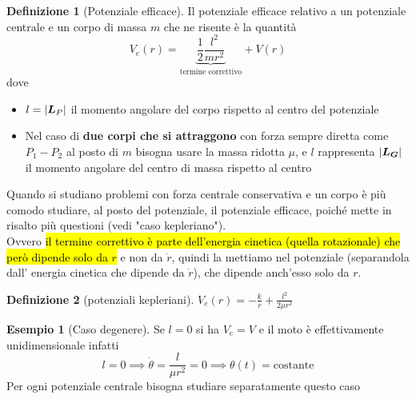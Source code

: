 \documentclass[a4paper,10pt]{article}
\theoremstyle{definition}
\newcommand{\bv}{\boldsymbol} %
\theoremstyle{indentdefinition}
\newtheorem{defn}{Definizione}[section]
\theoremstyle{indenttheorem}
\theoremstyle{myremark}
\newtheorem{example*}{Esempio}
\theoremstyle{indentgeneral}
\begin{document}
\begin{defn}[Potenziale efficace] Il potenziale efficace relativo a un potenziale centrale e un corpo di massa $m$ che ne risente è la quantità
$$V_e(r)=\underbrace{\frac{1}{2}\frac{l^2}{m r^2}}_{\text{termine correttivo}}+V(r)$$
dove 
\begin{itemize}
    \item $l=\abs{\bv{L}_P}$ il momento angolare del corpo rispetto al centro del potenziale
    \item Nel caso di \textbf{due corpi che si attraggono} con forza sempre diretta come $P_1-P_2$ al posto di $m$ bisogna usare la massa ridotta $\mu$, e $l$ rappresenta  $\abs{\bv{L}_{\bv{G}}}$ il momento angolare del centro di massa rispetto al centro
\end{itemize}

Quando si studiano problemi con forza centrale conservativa e un corpo è più comodo studiare, al posto del potenziale, il potenziale efficace, poiché mette in risalto più questioni (vedi "caso kepleriano"). \\Ovvero \hl{il termine correttivo è parte dell'energia cinetica (quella rotazionale) che però dipende solo da $r$} e non da $\dot{r}$, quindi la mettiamo nel potenziale (separandola dall' energia cinetica che dipende da $\dot{r}$), che dipende anch'esso solo da $r$.
    
\end{defn}

\begin{defn}[potenziali kepleriani]
$V_{e}\left(r\right)=-\frac{k}{r}+\frac{l^{2}}{2\mu r^{2}}$
\end{defn}

\begin{example*}[Caso degenere] Se $l=0$ si ha $V_e=V$ e il moto è effettivamente unidimensionale infatti 
$$l=0\implies \dot{\theta}=\frac{l}{\mu r^2}=0\implies\theta(t)=\text{costante}$$
    Per ogni potenziale centrale bisogna studiare separatamente questo caso
\end{example*}
\end{document}
